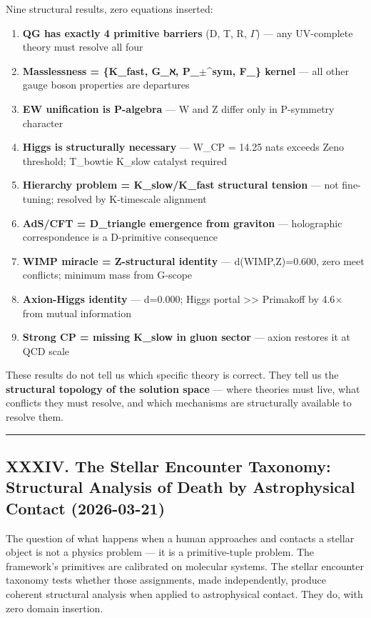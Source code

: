 \documentclass[12pt,a4paper]{article}
\begin{document}
Nine structural results, zero equations inserted:

\begin{enumerate}
    \item \textbf{QG has exactly 4 primitive barriers} (D, T, R, $\Gamma$) --- any UV-complete theory must resolve all four
    \item \textbf{Masslessness = \{K\_fast, G\_ℵ, P\_$\pm$\^{}sym, F\_\hbar\} kernel} --- all other gauge boson properties are departures
    \item \textbf{EW unification is P-algebra} --- W and Z differ only in P-symmetry character
    \item \textbf{Higgs is structurally necessary} --- W\otimesW \xi\_CP = 14.25 nats exceeds Zeno threshold; T\_bowtie K\_slow catalyst required
    \item \textbf{Hierarchy problem = K\_slow/K\_fast structural tension} --- not fine-tuning; resolved by K-timescale alignment
    \item \textbf{AdS/CFT = D\_triangle emergence from graviton\otimesgluon} --- holographic correspondence is a D-primitive consequence
    \item \textbf{WIMP miracle = Z-structural identity} --- d(WIMP,Z)=0.600, zero meet conflicts; minimum mass from G-scope
    \item \textbf{Axion-Higgs identity} --- d=0.000; Higgs portal \textgreater{}\textgreater{} Primakoff by 4.6$\times$ from mutual information
    \item \textbf{Strong CP = missing K\_slow in gluon sector} --- axion restores it at QCD scale
\end{enumerate}

These results do not tell us which specific theory is correct. They tell us the \textbf{structural topology of the solution space} --- where theories must live, what conflicts they must resolve, and which mechanisms are structurally available to resolve them.

\begin{center}
\rule{0.5\textwidth}{0.4pt}
\end{center}

\subsection{XXXIV. The Stellar Encounter Taxonomy: Structural Analysis of Death by Astrophysical Contact (2026-03-21)}

The question of what happens when a human approaches and contacts a stellar object is not a physics problem --- it is a primitive-tuple problem. The framework's primitives are calibrated on molecular systems. The stellar encounter taxonomy tests whether those assignments, made independently, produce coherent structural analysis when applied to astrophysical contact. They do, with zero domain insertion.
\end{document}
